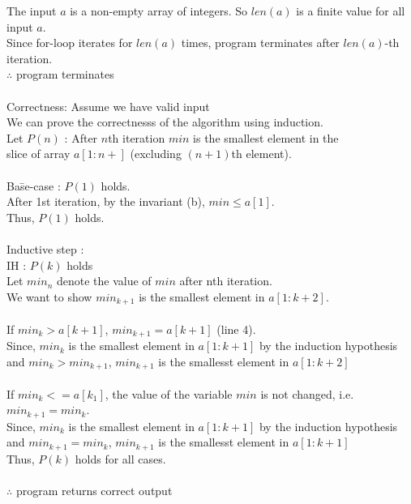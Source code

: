 \documentclass[solutionorbox,answers]{exam}
\begin{document}
\begin{questions}
\begin{parts}
\begin{solutionbox}{9in}
\begin{tabbing}
    \> The input $a$ is a non-empty array of integers. So $len(a)$ is a finite value for all input $a$.\\
    \> Since for-loop iterates for $len(a)$ times, program terminates after $len(a)$-th iteration.\\
    \> $\therefore$ program terminates\\
    \\
    Correctness: Assume we have valid input\\
    \> We can prove the correctnesss of the algorithm using induction.\\
    \> Let $P(n)$ : After $n$th iteration $min$ is the smallest element in the \\
    \>slice of array $a[1:n+]$ (excluding $(n+1)$th element).\\
    \\
    \> Ba\=se-case : $P(1)$ holds.\\
    \>\> After 1st iteration, by the invariant (b), $min \leq a[1]$.\\
    \>\> Thus, $P(1)$ holds.\\
    \\
    \> Inductive step :\\
    \>\> IH : $P(k)$ holds\\
    \>\> Let $min_n$ denote the value of $min$ after nth iteration.\\
    \>\> We want to show $min_{k+1}$ is the smallest element in $a[1:k+2]$.\\
    \\
    \>\> If $min_k > a[k+1]$, $min_{k+1}=a[k+1]$ (line 4).\\ 
    \>\> Since, $min_k$ is the smallest element in $a[1:k+1]$ by the induction hypothesis\\
    \>\> and $min_k > min_{k+1}$, $min_{k+1}$ is the smallesst element in $a[1:k+2]$\\
    \\
    \>\> If $min_k <=a[k_1]$, the value of the variable $min$ is not changed, i.e. $min_{k+1} = min_k$.\\
    \>\> Since, $min_k$ is the smallest element in $a[1:k+1]$ by the induction hypothesis\\
    \>\> and $min_{k+1} = min_k$, $min_{k+1}$ is the smallesst element in $a[1:k+1]$\\
    \>\> Thus, $P(k)$ holds for all cases.\\
    \\
    \> $\therefore$ program returns correct output\\
  \end{tabbing}
  \end{solutionbox}


\end{parts}
\end{questions}
\end{document}
